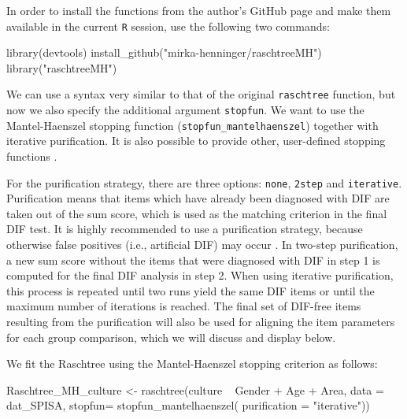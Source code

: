 \documentclass[doc,floatsintext,natbib]{apa7}
\begin{document}
In order to install the functions from the author's GitHub page and make them available in the current \texttt{R} session, use the following two commands:

\begin{Schunk}
\begin{Sinput}
 library(devtools)
 install_github("mirka-henninger/raschtreeMH")
 library("raschtreeMH")
\end{Sinput}
\end{Schunk}

We can use a syntax very similar to that of the original \texttt{raschtree} function, but now we also specify the additional argument \texttt{stopfun}. We want to use the Mantel-Haenszel stopping function (\texttt{stopfun\_mantelhaenszel}) together with iterative purification. It is also possible to provide other, user-defined stopping functions \citep[see][for details]{HennyDeba23}.

For the purification strategy, there are three options: \texttt{none}, \texttt{2step} and \texttt{iterative}. Purification means that items which have already been diagnosed with DIF are taken out of the sum score, which is used as the matching criterion in the final DIF test. It is highly recommended to use a purification strategy, because otherwise false positives (i.e., artificial DIF) may occur \citep[cf., e.g.,][and the references therein]{DebStrZei:2022:CRC,HennyDeba23,Kopfetal:2015:EPM}. In two-step purification, a new sum score without the items that were diagnosed with DIF in step 1 is computed for the final DIF analysis in step 2. When using iterative purification, this process is repeated until two runs yield the same DIF items or until the maximum number of iterations is reached. 
The final set of DIF-free items resulting from the purification will also be used for aligning the item parameters for each group comparison, which we will discuss and display below.

We fit the Raschtree using the Mantel-Haenszel stopping criterion as follows:


\begin{Schunk}
\begin{Sinput}
 Raschtree_MH_culture <- raschtree(culture ~  Gender + Age + Area,
                                   data = dat_SPISA,
                                   stopfun= stopfun_mantelhaenszel(
                                     purification = "iterative"))
\end{Sinput}
\end{Schunk}
\end{document}
